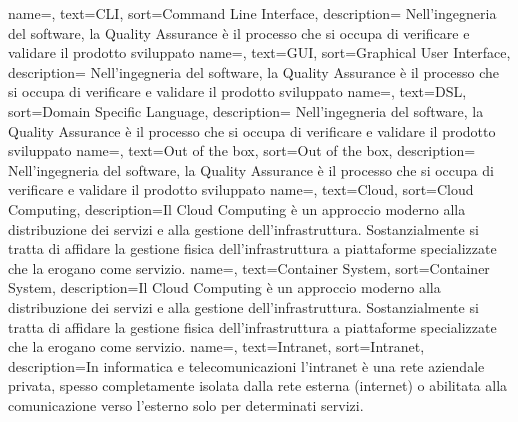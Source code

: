 {
	name=,
	text=CLI,
	sort=Command Line Interface,
	description={ Nell'ingegneria del software, la Quality Assurance è il processo che si occupa di verificare e validare il prodotto sviluppato}
}
{
	name=,
	text=GUI,
	sort=Graphical User Interface,
	description={ Nell'ingegneria del software, la Quality Assurance è il processo che si occupa di verificare e validare il prodotto sviluppato}
}
{
	name=,
	text=DSL,
	sort=Domain Specific Language,
	description={ Nell'ingegneria del software, la Quality Assurance è il processo che si occupa di verificare e validare il prodotto sviluppato}
}
{
	name=,
	text=Out of the box,
	sort=Out of the box,
	description={ Nell'ingegneria del software, la Quality Assurance è il processo che si occupa di verificare e validare il prodotto sviluppato}
}
{
	name=,
	text=Cloud,
	sort=Cloud Computing,
	description={Il Cloud Computing è un approccio moderno alla distribuzione dei servizi e alla gestione dell’infrastruttura. Sostanzialmente si tratta di affidare la gestione fisica dell’infrastruttura a piattaforme specializzate che la erogano come servizio.}
}
{
	name=,
	text=Container System,
	sort=Container System,
	description={Il Cloud Computing è un approccio moderno alla distribuzione dei servizi e alla gestione dell’infrastruttura. Sostanzialmente si tratta di affidare la gestione fisica dell’infrastruttura a piattaforme specializzate che la erogano come servizio.}
}
{
	name=,
	text=Intranet,
	sort=Intranet,
	description={In informatica e telecomunicazioni l'intranet è una rete aziendale privata, spesso completamente isolata dalla rete esterna (internet) o abilitata alla comunicazione verso l'esterno solo per determinati servizi.}
}